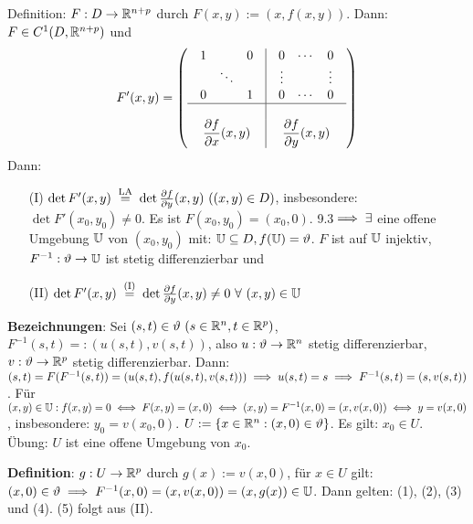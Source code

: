 \documentclass[a4paper,oneside,DIV15,BCOR12mm,chapterprefix=true,headings=onelinechapter]{scrbook}
\begin{document}
\begin{beweis}
Definition: $F:D\to\mathbb{R}^{n+p}$ durch $F(x,y):=(x,f(x,y))$. Dann: $F\in C^1(D,\mathbb{R}^{n+p})$ und
$$
F'(x,y)=\left(\begin{array}{c|c}
\begin{array}{ccc}
1  &        & 0 \\
   & \ddots &   \\
0  &        & 1 \\
\end{array} & 
\begin{array}{ccc}
0  & \cdots & 0 \\
\vdots   &  & \vdots  \\
0  & \cdots & 0 \\
\end{array} \\
\hline\\
\displaystyle\frac{\partial f}{\partial x}(x,y)&
\displaystyle\frac{\partial f}{\partial y}(x,y)
\end{array}
\right)$$
Dann: \begin{enumerate}
\item[(I)] $\det F'(x,y)\gleichnach{LA}\det\frac{\partial f}{\partial y}(x,y)\ ((x, y) \in D)$, insbesondere: $\det F'(x_0, y_0)\ne 0$. Es ist $F(x_0, y_0)=(x_0, 0)$. 9.3$\implies\exists$ eine offene Umgebung $\mathbb{U}$ von $(x_0, y_0)$ mit: $\mathbb{U}\subseteq D, f(\mathbb{U})=\vartheta$. $F$ ist auf $\mathbb{U}$ injektiv, $F^{-1}:\vartheta\to\mathbb{U}$ ist stetig differenzierbar und
\item[(II)] $\det F'(x,y)\gleichnach{(I)}\det\frac{\partial f}{\partial y}(x,y)\ne 0\ \forall\ (x,y)\in\MdU$
\end{enumerate}
\textbf{Bezeichnungen}: Sei $(s,t)\in\vartheta\ (s\in\mathbb{R}^n, t\in\mathbb{R}^p)$, $F^{-1}(s,t)=:(u(s,t),v(s,t))$, also $u:\vartheta\to\mathbb{R}^n$ stetig differenzierbar, $v:\vartheta\to\mathbb{R}^p$ stetig differenzierbar. Dann: $(s,t)=F(F^{-1}(s,t))=(u(s,t),f(u(s,t),v(s,t)))\implies u(s,t)=s\implies F^{-1}(s,t)=(s,v(s,t))$. Für $(x,y)\in\mathbb{U}: f(x,y)=0\iff F(x,y)=(x,0)\iff(x,y)=F^{-1}(x,0)=(x,v(x,0))\iff y=v(x,0)$, insbesondere: $y_0=v(x_0,0)$. $U:=\{x\in\mathbb{R}^n: (x,0)\in\vartheta\}$. Es gilt: $x_0\in U$. Übung: $U$ ist eine offene Umgebung von $x_0$.

\textbf{Definition}: $g:U\to\mathbb{R}^p$ durch $g(x):=v(x,0)$, für $x\in U$ gilt: $(x,0)\in\vartheta\implies F^{-1}(x,0)=(x,v(x,0))=(x,g(x))\in \mathbb{U}$. Dann gelten: (1), (2), (3) und (4). (5) folgt aus (II).


\end{beweis}
\end{document}
